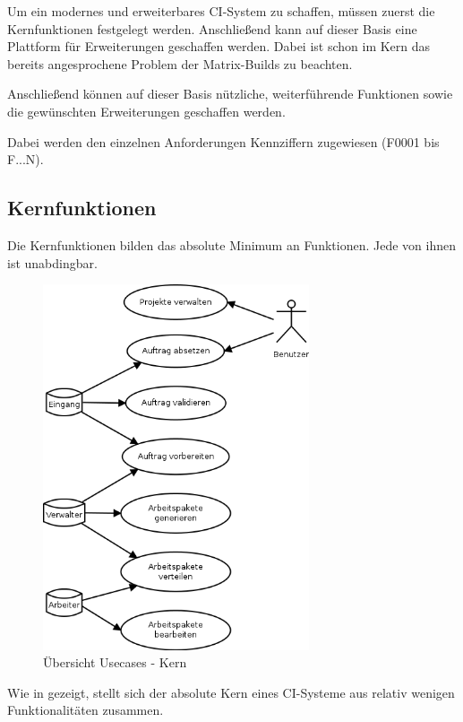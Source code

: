 Um ein modernes und erweiterbares \ac{CI}-System zu schaffen,
müssen zuerst die Kernfunktionen festgelegt werden.
Anschließend kann auf dieser Basis
eine Plattform für Erweiterungen geschaffen werden.
Dabei ist schon im Kern das bereits angesprochene Problem
der Matrix-Builds zu beachten.

Anschließend können auf dieser Basis nützliche, weiterführende Funktionen
sowie die gewünschten Erweiterungen geschaffen werden.

Dabei werden den einzelnen Anforderungen Kennziffern zugewiesen (F0001 bis F...N).

\subsection{Kernfunktionen}

Die Kernfunktionen bilden das absolute Minimum an Funktionen.
Jede von ihnen ist unabdingbar.

\begin{figure}[ht]
  \centering
  \includegraphics[width=0.7\textwidth]{imageinput/use-case-muss.png}
  \caption{\"Ubersicht Usecases - Kern}
  \label{fig:use-case-muss}
\end{figure}

Wie in  gezeigt,
stellt sich der absolute Kern eines CI-Systeme aus relativ wenigen Funktionalitäten zusammen.

